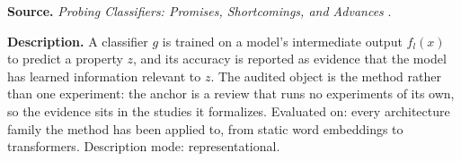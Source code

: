 
\textbf{Source.} \emph{Probing Classifiers: Promises, Shortcomings, and Advances} \citep{belinkov2022probing}.

\textbf{Description.} A classifier $g$ is trained on a model's intermediate output $f_l(x)$ to predict a property $z$, and its accuracy is reported as evidence that the model has learned information relevant to $z$. The audited object is the method rather than one experiment: the anchor is a review that runs no experiments of its own, so the evidence sits in the studies it formalizes. Evaluated on: every architecture family the method has been applied to, from static word embeddings to transformers. Description mode: representational.

\vspace{4pt}
